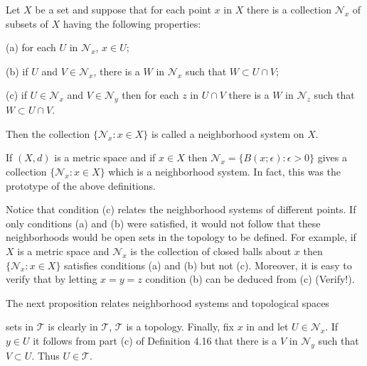 Let $X$ be a set and suppose that for each point $x$ in $X$ there is a collection $\mathcal{N}_x$ of subsets of $X$ having the following properties:

(a) for each $U$ in $\mathcal{N}_x$, $x \in U$;

(b) if $U$ and $V \in \mathcal{N}_x$, there is a $W$ in $\mathcal{N}_x$ such that $W \subset U \cap V$;

(c) if $U \in \mathcal{N}_x$ and $V \in \mathcal{N}_y$ then for each $z$ in $U \cap V$ there is a $W$ in $\mathcal{N}_z$ such that $W \subset U \cap V$.

Then the collection $\{\mathcal{N}_x: x \in X\}$ is called a neighborhood system on $X$.

If $(X, d)$ is a metric space and if $x \in X$ then $\mathcal{N}_x = \{B(x; \epsilon): \epsilon > 0\}$ gives a collection $\{\mathcal{N}_x: x \in X\}$ which is a neighborhood system. In fact, this was the prototype of the above definitions.

Notice that condition (c) relates the neighborhood systems of different points. If only conditions (a) and (b) were satisfied, it would not follow that these neighborhoods would be open sets in the topology to be defined. For example, if $X$ is a metric space and $\mathcal{N}_x$ is the collection of closed balls about $x$ then $\{\mathcal{N}_x: x \in X\}$ satisfies conditions (a) and (b) but not (c). Moreover, it is easy to verify that by letting $x = y = z$ condition (b) can be deduced from (c) (Verify!).

The next proposition relates neighborhood systems and topological spaces

sets in $\mathcal{T}$ is clearly in $\mathcal{T}$, $\mathcal{T}$ is a topology. Finally, fix $x$ in and let $U \in \mathcal{N}_x$. If $y \in U$ it follows from part (c) of Definition 4.16 that there is a $V$ in $\mathcal{N}_y$ such that $V \subset U$. Thus $U \in \mathcal{T}$.